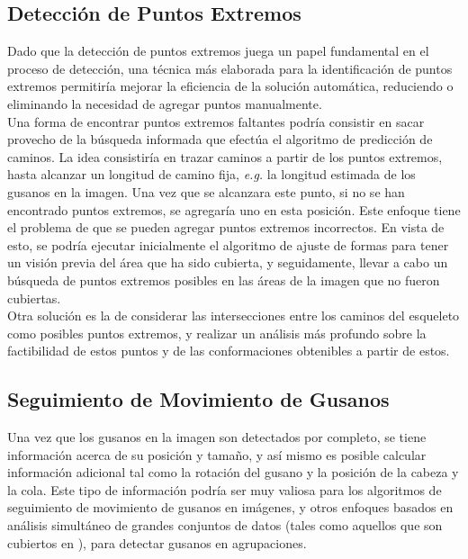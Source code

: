 \subsection*{Detecci\'on de Puntos Extremos}
Dado que la detecci\'on de puntos extremos juega un papel fundamental
en el proceso de detecci\'on, una t\'ecnica m\'as elaborada para la 
identificaci\'on de puntos extremos permitir\'ia mejorar la eficiencia de la
soluci\'on autom\'atica, reduciendo o eliminando la necesidad de agregar
puntos manualmente.\\

Una forma de encontrar puntos extremos faltantes podr\'ia consistir en sacar
provecho de la b\'usqueda informada que efect\'ua el algoritmo de predicci\'on
de caminos. La idea consistir\'ia en trazar caminos a partir de los puntos extremos,
hasta alcanzar un longitud de camino fija, \emph{e.g.} la longitud estimada
de los gusanos en la imagen. Una vez que se alcanzara este punto, si no se han
encontrado puntos extremos, se agregar\'ia uno en esta posici\'on. Este enfoque
tiene el problema de que se pueden agregar puntos extremos incorrectos. En vista
de esto, se podr\'ia ejecutar inicialmente el algoritmo de ajuste de formas para
tener un visi\'on previa del \'area que ha sido cubierta, y seguidamente, llevar
a cabo un b\'usqueda de puntos extremos posibles en las \'areas de la imagen
que no fueron cubiertas.\\

Otra soluci\'on es la de considerar las intersecciones entre los caminos
del esqueleto como posibles puntos extremos, y realizar un an\'alisis m\'as
profundo sobre la factibilidad de estos puntos y de las conformaciones 
obtenibles a partir de estos.

\subsection*{Seguimiento de Movimiento de Gusanos}
Una vez que los gusanos en la imagen son detectados por completo, se 
tiene informaci\'on acerca de su posici\'on y tama\~no, y as\'i mismo es
posible calcular informaci\'on adicional tal como la rotaci\'on del gusano y la
posici\'on de la cabeza y la cola. Este tipo de informaci\'on 
podr\'ia ser muy valiosa para los algoritmos de seguimiento de movimiento
de gusanos en im\'agenes, y otros enfoques basados en an\'alisis simult\'aneo
de grandes conjuntos de datos (tales como aquellos que son cubiertos en
\cite{automated}), para detectar gusanos en agrupaciones.

